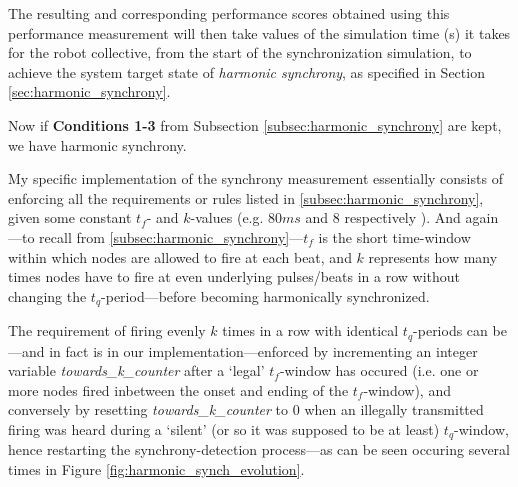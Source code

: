 	The resulting and corresponding performance scores obtained using this performance measurement will then take values of the simulation time (s) it takes for the robot collective, from the start of the synchronization simulation, to achieve the system target state of \textit{harmonic synchrony}, as specified in Section \ref{sec:harmonic_synchrony}.

	Now if \textbf{Conditions 1-3} from Subsection \ref{subsec:harmonic_synchrony} are kept, we have harmonic synchrony.

	My specific implementation of the synchrony measurement essentially consists of enforcing all the requirements or rules listed in \ref{subsec:harmonic_synchrony}, given some constant $t_f$- and $k$-values (e.g. $80ms$ and $8$ respectively \cite{nymoen_synch}). And again—to recall from \ref{subsec:harmonic_synchrony}—$t_f$ is the short time-window within which nodes are allowed to fire at each beat, and $k$ represents how many times nodes have to fire at even underlying pulses/beats in a row without changing the $t_q$-period—before becoming harmonically synchronized.

	The requirement of firing evenly $k$ times in a row with identical $t_q$-periods can be—and in fact is in our implementation—enforced by incrementing an integer variable \textit{towards\_k\_counter} after a `legal' $t_f$-window has occured (i.e. one or more nodes fired inbetween the onset and ending of the $t_f$-window), and conversely by resetting \textit{towards\_k\_counter} to 0 when an illegally transmitted firing was heard during a `silent' (or so it was supposed to be at least) $t_q$-window, hence restarting the synchrony-detection process—as can be seen occuring several times in Figure \ref{fig:harmonic_synch_evolution}. 


